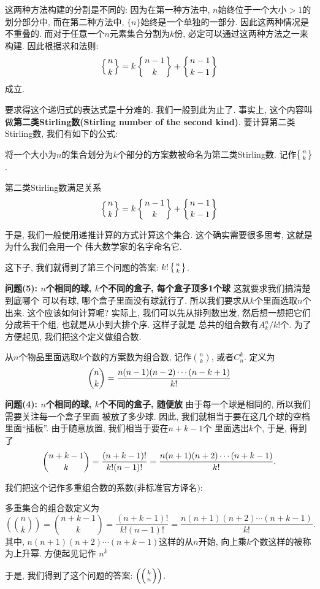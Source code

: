 这两种方法构建的分割是不同的: 因为在第一种方法中, $n$始终位于一个大小$>1$的划分部分中, 
而在第二种方法中, $\{n\}$始终是一个单独的一部分. 因此这两种情况是不重叠的. 
而对于任意一个$n$元素集合分割为$k$份, 必定可以通过这两种方法之一来构建. 因此根据求和法则: 
$$
\left\{{n \atop k}\right\}=k\left\{{n-1 \atop k}\right\}+\left\{{n-1 \atop k-1}\right\}
$$
成立. 

要求得这个递归式的表达式是十分难的. 我们一般到此为止了. 事实上, 这个内容叫做{\textbf{第二类Stirling数(Stirling number of the second kind)}}. 
要计算第二类Stirling数, 我们有如下的公式: 

\begin{definition}[第二类Stirling数]
  将一个大小为$n$的集合划分为$k$个部分的方案数被命名为第二类Stirling数. 记作$\left\{{n \atop k}\right\}$. 
\end{definition}

\begin{theorem}
  第二类Stirling数满足关系
  $$
  \left\{{n \atop k}\right\}=k\left\{{n-1 \atop k}\right\}+\left\{{n-1 \atop k-1}\right\}
  $$
\end{theorem}

于是, 我们一般使用递推计算的方式计算这个集合. 这个确实需要很多思考, 这就是为什么我们会用一个
伟大数学家的名字命名它. 

这下子, 我们就得到了第三个问题的答案: $k! \left\{{n \atop k}\right\}$. 

\textbf{问题(5): $n$个相同的球, $k$个不同的盒子, 每个盒子顶多1个球} 这就要求我们搞清楚到底哪个
可以有球, 哪个盒子里面没有球就行了. 所以我们要求从$k$个里面选取$n$个出来. 这个应该如何计算呢? 
实际上, 我们可以先从排列数出发, 然后想一想把它们分成若干个组, 也就是从小到大排个序. 这样子就是
总共的组合数有$A_k^n/k!$个. 为了方便起见, 我们把这个定义做组合数. 

\begin{definition}[组合数]
  从$n$个物品里面选取$k$个数的方案数为组合数, 记作${n\choose k}$, 或者$C_n^k$. 定义为
  $$
  {n\choose k}={n(n-1)(n-2)\cdots(n-k+1)\over k!}
  $$
\end{definition}


\textbf{问题(4): $n$个相同的球, $k$个不同的盒子, 随便放} 由于每一个球是相同的, 所以我们需要关注每一个盒子里面
被放了多少球. 因此, 我们就相当于要在这几个球的空档里面``插板''. 由于随意放置, 我们相当于要在$n+k-1$个
里面选出$k$个, 于是, 得到了
$$
{n+k-1\choose k} = \frac{(n+k-1)!}{k!(n-1)!} = {n(n+1)(n+2)\cdots(n+k-1)\over k!}.
$$

我们把这个记作多重组合数的系数(非标准官方译名): 

\begin{definition}[多重集合组合数]
  多重集合的组合数定义为
  $$
  \left(\binom nk\right)=\binom{n+k-1}k=\frac{(n+k-1)!}{k!\left(n-1\right)!}=\frac{n(n+1)(n+2)\cdots(n+k-1)}{k!}.
  $$
  其中, $n(n+1)(n+2)\cdots(n+k-1)$这样的从$n$开始, 向上乘$k$个数这样的被称为上升幂. 方便起见记作
  $n^{\bar k}$
\end{definition}
于是, 我们得到了这个问题的答案: $\left(\left({k \atop n}\right)\right)$. 


